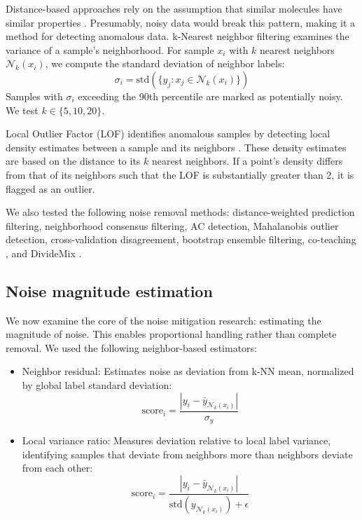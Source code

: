 {Distance-based approaches rely on the assumption that similar molecules have similar properties \citep{Cherkasov2014}. Presumably, noisy data would break this pattern, making it a method for detecting anomalous data. k-Nearest neighbor filtering examines the variance of a sample's neighborhood. For sample $x_i$ with $k$ nearest neighbors $\mathcal{N}_k(x_i)$, we compute the standard deviation of neighbor labels:
$$
\sigma_i = \text{std}(\{y_j : x_j \in \mathcal{N}_k(x_i)\})
$$
Samples with $\sigma_i$ exceeding the 90th percentile are marked as potentially noisy. We test $k \in \{5, 10, 20\}$.

Local Outlier Factor (LOF) identifies anomalous samples by detecting local density estimates between a sample and its neighbors \citep{Breunig2000}. These density estimates are based on the distance to its $k$ nearest neighbors. If a point's density differs from that of its neighbors such that the LOF is substantially greater than 2, it is flagged as an outlier.

We also tested the following noise removal methods:  distance-weighted prediction filtering, neighborhood consensus filtering, AC detection, Mahalanobis outlier detection, cross-validation disagreement, bootstrap ensemble filtering, co-teaching \citep{Han2018}, and DivideMix \citep{li2020dividemix}.

\subsection{Noise magnitude estimation}

We now examine the core of the noise mitigation research: estimating the magnitude of noise. This enables proportional handling rather than complete removal. We used the following neighbor-based estimators:

\begin{itemize}
    \item Neighbor residual: Estimates noise as deviation from k-NN mean, normalized by global label standard deviation:
    $$\text{score}_i = \frac{|y_i - \bar{y}_{\mathcal{N}_k(x_i)}|}{\sigma_y}$$
    
    \item Local variance ratio: Measures deviation relative to local label variance, identifying samples that deviate from neighbors more than neighbors deviate from each other:
    $$\text{score}_i = \frac{|y_i - \bar{y}_{\mathcal{N}_k(x_i)}|}{\text{std}(y_{\mathcal{N}_k(x_i)}) + \epsilon}$$
    

\end{itemize}}
